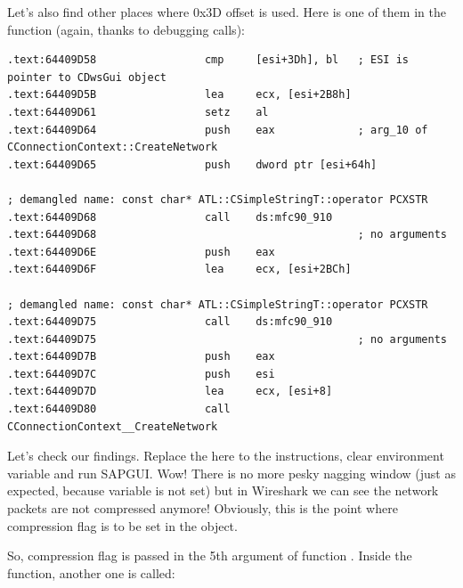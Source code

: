 {Let's also find other places where 0x3D offset is used. 
Here is one of them in the  function (again, thanks to debugging calls):}

\begin{lstlisting}
.text:64409D58                 cmp     [esi+3Dh], bl   ; ESI is pointer to CDwsGui object
.text:64409D5B                 lea     ecx, [esi+2B8h]
.text:64409D61                 setz    al
.text:64409D64                 push    eax             ; arg_10 of CConnectionContext::CreateNetwork
.text:64409D65                 push    dword ptr [esi+64h]

; demangled name: const char* ATL::CSimpleStringT::operator PCXSTR 
.text:64409D68                 call    ds:mfc90_910
.text:64409D68                                         ; no arguments
.text:64409D6E                 push    eax
.text:64409D6F                 lea     ecx, [esi+2BCh]

; demangled name: const char* ATL::CSimpleStringT::operator PCXSTR 
.text:64409D75                 call    ds:mfc90_910
.text:64409D75                                         ; no arguments
.text:64409D7B                 push    eax
.text:64409D7C                 push    esi
.text:64409D7D                 lea     ecx, [esi+8]
.text:64409D80                 call    CConnectionContext__CreateNetwork
\end{lstlisting}

{Let's check our findings. Replace the  here to the  instructions,
clear \TDWNC 
environment variable and run SAPGUI. Wow! There is no more pesky nagging window (just as expected, 
because variable is not set) but in Wireshark we can see the network packets are not compressed anymore! 
Obviously, this is the point where compression flag is to be set in the  object.}

{So, compression flag is passed in the 5th argument of function . 
Inside the function, another one is called:}

